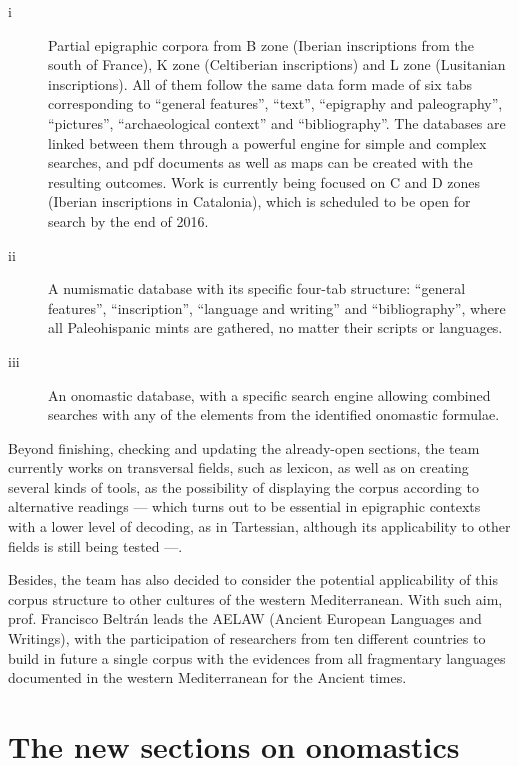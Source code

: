 \documentclass[amsthm,ebook]{saparticle}
\begin{document}
\begin{description}
\item[i] Partial epigraphic corpora from B zone (Iberian inscriptions from the south of France), K zone (Celtiberian
inscriptions) and L zone (Lusitanian inscriptions). All of them follow the same data form made of six tabs
corresponding to ``general features'', ``text'',
``epigraphy and paleography'', ``pictures'',
``archaeological context'' and ``bibliography''. The databases are
linked between them through a powerful engine for simple and complex searches, and pdf documents as well as maps can be
created with the resulting outcomes. Work is currently being focused on C and D zones (Iberian inscriptions in
Catalonia), which is scheduled to be open for search by the end of 2016.

\item[ii] A numismatic database with its specific four-tab structure: ``general features'',
``inscription'', ``language and writing'' and
``bibliography'', where all Paleohispanic mints are gathered, no matter their scripts or
languages.

\item[iii] An onomastic database, with a specific search engine allowing combined searches with any of the elements from the identified onomastic formulae. 

\end{description}

Beyond finishing, checking and updating the already-open sections, the team currently works on transversal fields, such
as lexicon, as well as on creating several kinds of tools, as the possibility of displaying the corpus according to
alternative readings --- which turns out to be essential in epigraphic contexts with a lower level of decoding, as in
Tartessian, although its applicability to other fields is still being tested ---. 

Besides, the team has also decided to consider the potential applicability of this corpus structure to other cultures of
the western Mediterranean. With such aim, prof. Francisco Beltrán leads the AELAW (Ancient European Languages
and Writings), with the participation of researchers from ten different countries to build in future a single corpus with the evidences from all fragmentary languages documented in the
western Mediterranean for the Ancient times.

\section{The new sections on onomastics}
\end{document}

